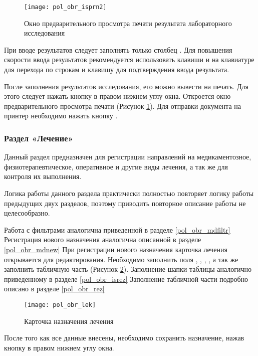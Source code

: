  \begin{figure}[h!]\centering
   \texttt{[image: pol\_obr\_isprn2]}
   \caption{Окно предварительного просмотра печати результата лабораторного исследования}
   \label{img_pol_obr_isprn2}
 \end{figure}

При вводе результатов следует заполнять только столбец . Для повышения скорости ввода результатов рекомендуется использовать клавиши  и  на клавиатуре для перехода по строкам и клавишу  для подтверждения ввода результата.
 
После заполнения результатов исследования, его можно вывести на печать. Для этого следует нажать кнопку  в правом нижнем углу окна. Откроется окно предварительного просмотра печати (Рисунок \ref{img_pol_obr_isprn2}). Для отправки документа на принтер необходимо нажать кнопку .  

\subsubsection{Раздел «Лечение»} \label{pol_obr_lek}

Данный раздел предназначен для регистрации направлений на медикаментозное, физиотерапевтическое, оперативное и другие виды лечения, а так же для контроля их выполнения.

Логика работы данного раздела практически полностью повторяет логику работы предыдущих двух разделов, поэтому приводить повторное описание работы не целесообразно.

Работа с фильтрами аналогична приведенной в разделе \ref{pol_obr_mdfiltr} Регистрация нового назначения аналогична описанной в разделе \ref{pol_obr_mdnew} При регистрации нового назначения карточка лечения открывается для редактирования. Необходимо заполнить поля , , , , а так же заполнить табличную часть (Рисунок \ref{img_pol_obr_lek}). Заполнение шапки таблицы аналогично приведенному в разделе \ref{pol_obr_isrez} Заполнение табличной части подробно описано в разделе \ref{pol_obr_rez}

 \begin{figure}[ht]\centering
   \texttt{[image: pol\_obr\_lek]}
   \caption{Карточка назначения лечения}
   \label{img_pol_obr_lek}
 \end{figure}
 
После того как все данные внесены, необходимо сохранить назначение, нажав кнопку   в правом нижнем углу окна.


